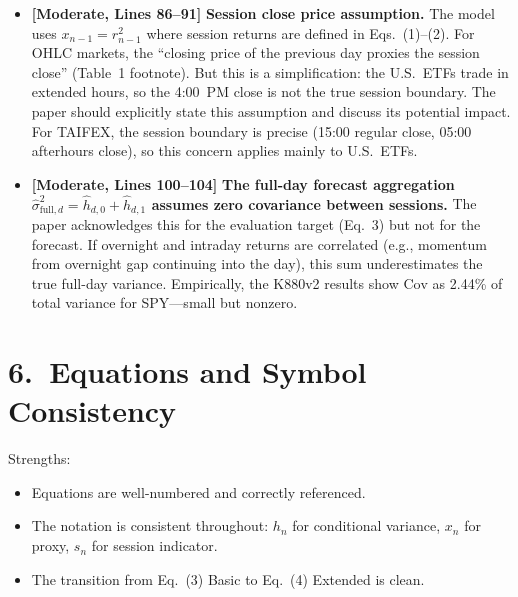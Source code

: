 \documentclass[12pt,a4paper]{article}
\begin{document}
\begin{itemize}[nosep]
\item [\textcolor{warncolor}{M7}] \textbf{[Moderate, Lines 86--91]} \textbf{Session close price assumption.} The model uses $x_{n-1} = r^2_{n-1}$ where session returns are defined in Eqs.~(1)--(2). For OHLC markets, the ``closing price of the previous day proxies the session close'' (Table~1 footnote). But this is a simplification: the U.S.\ ETFs trade in extended hours, so the 4:00~PM close is not the true session boundary. The paper should explicitly state this assumption and discuss its potential impact. For TAIFEX, the session boundary is precise (15:00 regular close, 05:00 afterhours close), so this concern applies mainly to U.S.\ ETFs.

\item [\textcolor{warncolor}{M8}] \textbf{[Moderate, Lines 100--104]} \textbf{The full-day forecast aggregation $\hat{\sigma}^2_{\text{full},d} = \hat{h}_{d,0} + \hat{h}_{d,1}$ assumes zero covariance between sessions.} The paper acknowledges this for the evaluation target (Eq.~3) but not for the forecast. If overnight and intraday returns are correlated (e.g., momentum from overnight gap continuing into the day), this sum underestimates the true full-day variance. Empirically, the K880v2 results show $\text{Cov}$ as 2.44\% of total variance for SPY---small but nonzero.
\end{itemize}

\bigskip

\section*{6.\ Equations and Symbol Consistency}

\noindent \textcolor{okgreen}{Strengths:}
\begin{itemize}[nosep]
\item Equations are well-numbered and correctly referenced.
\item The notation is consistent throughout: $h_n$ for conditional variance, $x_n$ for proxy, $s_n$ for session indicator.
\item The transition from Eq.~(3) Basic to Eq.~(4) Extended is clean.
\end{itemize}
\end{document}
